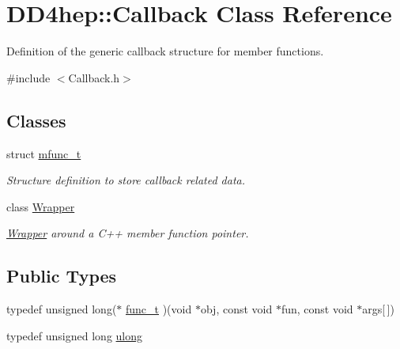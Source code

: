 \hypertarget{class_d_d4hep_1_1_callback}{
\section{DD4hep::Callback Class Reference}
\label{class_d_d4hep_1_1_callback}
}


Definition of the generic callback structure for member functions.  


{\ttfamily \#include $<$Callback.h$>$}\subsection*{Classes}
\begin{DoxyCompactItemize}
\item 
struct \hyperlink{struct_d_d4hep_1_1_callback_1_1mfunc__t}{mfunc\_\-t}
\begin{DoxyCompactList}\small\item\em Structure definition to store callback related data. \item\end{DoxyCompactList}\item 
class \hyperlink{class_d_d4hep_1_1_callback_1_1_wrapper}{Wrapper}
\begin{DoxyCompactList}\small\item\em \hyperlink{class_d_d4hep_1_1_callback_1_1_wrapper}{Wrapper} around a C++ member function pointer. \item\end{DoxyCompactList}\end{DoxyCompactItemize}
\subsection*{Public Types}
\begin{DoxyCompactItemize}
\item 
typedef unsigned long($\ast$ \hyperlink{class_d_d4hep_1_1_callback_a3b7cb36fa166495663680601ba5d7fe0}{func\_\-t} )(void $\ast$obj, const void $\ast$fun, const void $\ast$args\mbox{[}$\,$\mbox{]})
\item 
typedef unsigned long \hyperlink{class_d_d4hep_1_1_callback_ac676aa0685e2ba51bac69c33f8066431}{ulong}
\end{DoxyCompactItemize}
